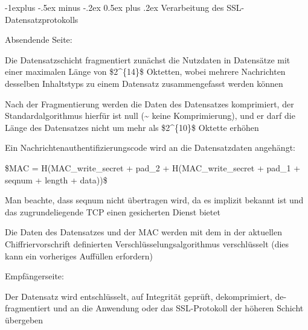 \documentclass[a4paper]{article}
\makeatletter
\renewcommand{\subsection}{\@startsection{subsection}{2}{0mm}%
 {-1explus -.5ex minus -.2ex}%
 {0.5ex plus .2ex}%
 {\normalfont\normalsize\bfseries}}
\makeatother
\begin{document}
\begin{multicols}{3}
\begin{itemize*}
            \subsection{Verarbeitung des
                  SSL-Datensatzprotokolls}
            \begin{itemize*}
                  \item       Absendende Seite:
                  \begin{itemize*}
                        \item Die Datensatzschicht fragmentiert zunächst die Nutzdaten in Datensätze mit einer maximalen Länge von \$2\^{}\{14\}\$ Oktetten, wobei mehrere Nachrichten desselben Inhaltstyps zu einem Datensatz zusammengefasst werden können
                        \item Nach der Fragmentierung werden die Daten des Datensatzes komprimiert, der Standardalgorithmus hierfür ist null (\textasciitilde{} keine Komprimierung), und er darf die Länge des Datensatzes nicht um mehr als \$2\^{}\{10\}\$ Oktette erhöhen
                        \item Ein Nachrichtenauthentifizierungscode wird an die Datensatzdaten angehängt:
                        \begin{itemize*} \item \$MAC = H(MAC\_write\_secret + pad\_2 + H(MAC\_write\_secret + pad\_1 + seqnum + length + data))\$ \item Man beachte, dass seqnum nicht übertragen wird, da es implizit bekannt ist und das zugrundeliegende TCP einen gesicherten Dienst bietet \end{itemize*}
                        \item Die Daten des Datensatzes und der MAC werden mit dem in der aktuellen Chiffriervorschrift definierten Verschlüsselungsalgorithmus verschlüsselt (dies kann ein vorheriges Auffüllen erfordern)
                  \end{itemize*}
                  \item       Empfängerseite:
                  \begin{itemize*}
                        \item Der Datensatz wird entschlüsselt, auf Integrität geprüft, dekomprimiert, de-fragmentiert und an die Anwendung oder das SSL-Protokoll der höheren Schicht übergeben
                  \end{itemize*}
            \end{itemize*}


\end{itemize*}
\end{multicols}
\end{document}

